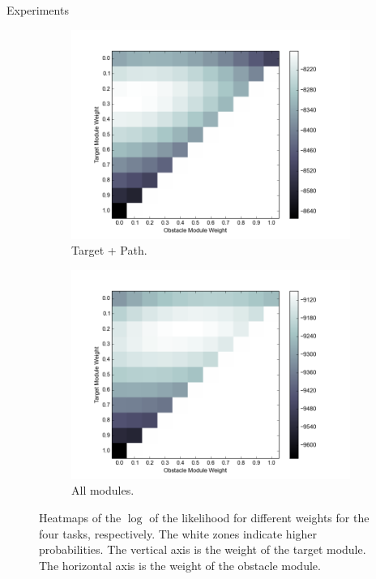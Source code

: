 \documentclass[final]{beamer}
\begin{document}
\begin{frame}{}
\begin{textblock}{86}
\begin{block}{Experiments}
\begin{figure}[h]
\begin{subfigure}[b]{0.24\textwidth}
\includegraphics[width=\textwidth]{objValuesTask3.png}
\caption{Target + Path. }
\end{subfigure}
\begin{subfigure}[b]{0.24\textwidth}
\includegraphics[width=\textwidth]{objValuesTask4.png}
\caption{All modules. }
\end{subfigure}
\caption{Heatmaps of the $\log$ of the likelihood for
different weights for the four tasks, respectively. The white zones indicate
higher probabilities. The vertical axis is the weight of the target module. The
horizontal axis is the weight of the obstacle module.
}
\label{fig:heatmap}
\end{figure}
\end{block}


\end{textblock}
\end{frame}
\end{document}

